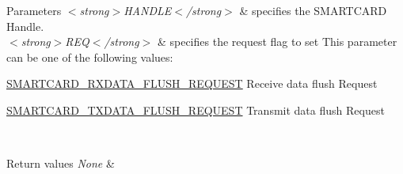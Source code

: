 \begin{DoxyParams}{Parameters}
{\em $<$strong$>$\+H\+A\+N\+D\+L\+E$<$/strong$>$} & specifies the S\+M\+A\+R\+T\+C\+A\+RD Handle. \\
\hline
{\em $<$strong$>$\+R\+E\+Q$<$/strong$>$} & specifies the request flag to set This parameter can be one of the following values\+: \begin{DoxyItemize}
\item \hyperlink{group___s_m_a_r_t_c_a_r_d___request___parameters_ga99f5bbd7c32c09d0fc84ad4ec58bde26}{S\+M\+A\+R\+T\+C\+A\+R\+D\+\_\+\+R\+X\+D\+A\+T\+A\+\_\+\+F\+L\+U\+S\+H\+\_\+\+R\+E\+Q\+U\+E\+ST} Receive data flush Request \item \hyperlink{group___s_m_a_r_t_c_a_r_d___request___parameters_gab3fdde978ae746d718250e3c29b4e39d}{S\+M\+A\+R\+T\+C\+A\+R\+D\+\_\+\+T\+X\+D\+A\+T\+A\+\_\+\+F\+L\+U\+S\+H\+\_\+\+R\+E\+Q\+U\+E\+ST} Transmit data flush Request\end{DoxyItemize}
\\
\hline
\end{DoxyParams}

\begin{DoxyRetVals}{Return values}
{\em None} & \\
\hline
\end{DoxyRetVals}
